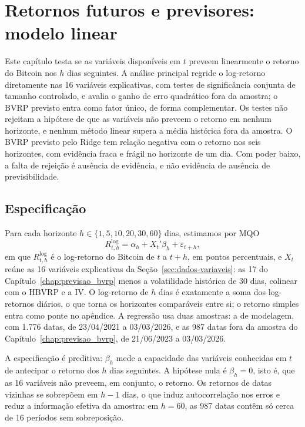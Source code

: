 \chapter{Retornos futuros e previsores: modelo linear}
\label{chap:retornos_linear}

Este capítulo testa se as variáveis disponíveis em $t$ preveem linearmente o
retorno do Bitcoin nos $h$ dias seguintes. A análise principal regride o
log-retorno diretamente nas 16 variáveis explicativas, com testes de
significância conjunta de tamanho controlado, e avalia o ganho de erro
quadrático fora da amostra; o BVRP previsto entra como fator único, de forma
complementar. Os testes não rejeitam a hipótese de que as variáveis não
preveem o retorno em nenhum horizonte, e nenhum método linear supera a média
histórica fora da amostra. O BVRP previsto pelo Ridge tem relação negativa com
o retorno nos seis horizontes, com evidência fraca e frágil no horizonte de um
dia. Com poder baixo, a falta de rejeição é ausência de evidência, e não
evidência de ausência de previsibilidade.

\section{Especificação}
\label{sec:retlin-especificacao}

Para cada horizonte $h \in \{1, 5, 10, 20, 30, 60\}$ dias, estimamos
por MQO
\[
R^{\log}_{t,h} = \alpha_h + X_t'\beta_h + \varepsilon_{t+h},
\]
em que $R^{\log}_{t,h}$ é o log-retorno do Bitcoin de $t$ a $t+h$, em pontos
percentuais, e $X_t$ reúne as 16 variáveis explicativas da
Seção~\ref{sec:dados-variaveis}: as 17 do Capítulo~\ref{chap:previsao_bvrp}
menos a volatilidade histórica de 30 dias, colinear com o HBVRP e a IV. O
log-retorno de $h$ dias é exatamente a soma dos log-retornos diários, o que
torna os horizontes comparáveis entre si; o retorno simples entra como ponte no
apêndice. A regressão usa duas amostras: a de modelagem, com 1.776 datas, de
23/04/2021 a 03/03/2026, e as 987 datas fora da amostra do
Capítulo~\ref{chap:previsao_bvrp}, de 21/06/2023 a 03/03/2026.

A especificação é preditiva: $\beta_h$ mede a capacidade das variáveis
conhecidas em $t$ de antecipar o retorno dos $h$ dias seguintes. A hipótese
nula é $\beta_h = 0$, isto é, que as 16 variáveis não preveem, em conjunto, o
retorno. Os retornos de datas vizinhas se sobrepõem em $h-1$ dias, o que induz
autocorrelação nos erros e reduz a informação efetiva da amostra: em $h = 60$,
as 987 datas contêm só cerca de 16 períodos sem sobreposição.

